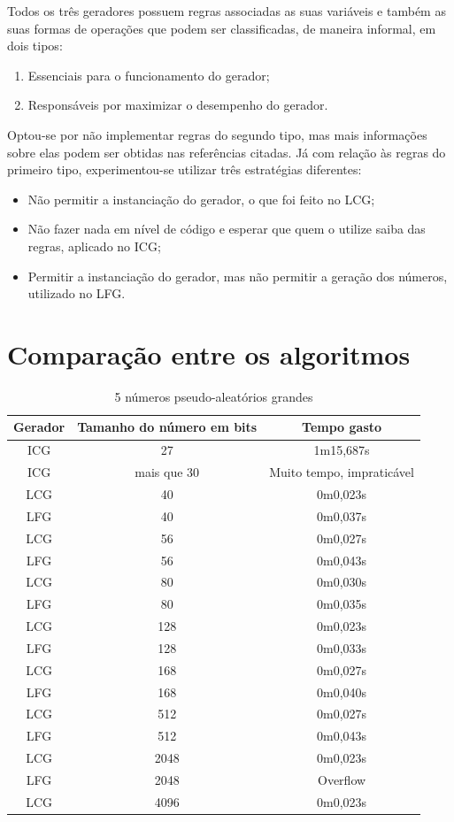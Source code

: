 \documentclass[12pt]{article}
\begin{document}
Todos os três geradores possuem regras associadas as suas variáveis e também as
suas formas de operações que podem ser classificadas, de maneira informal, em
dois tipos:
\begin{enumerate}
  \item Essenciais para o funcionamento do gerador;
  \item Responsáveis por maximizar o desempenho do gerador.
\end{enumerate}
Optou-se por não implementar regras do segundo tipo, mas mais informações sobre
elas podem ser obtidas nas referências citadas. Já com relação às regras do
primeiro tipo, experimentou-se utilizar três estratégias diferentes:
\begin{itemize}
  \item Não permitir a instanciação do gerador, o que foi feito no LCG;
  \item Não fazer nada em nível de código e esperar que quem o utilize saiba das
  regras, aplicado no ICG;
  \item Permitir a instanciação do gerador, mas não permitir a geração dos
  números, utilizado no LFG.
\end{itemize}

\section{Comparação entre os algoritmos}
\begin{table}[h]
  \centering
  \caption{5 números pseudo-aleatórios grandes}
  \begin{tabular}{|c|c|c|}
  \hline
  Gerador & Tamanho do número em bits & Tempo gasto  \\ \hline
  ICG     & 27 & 1m15,687s \\ \hline
  ICG     & mais que 30 & Muito tempo, impraticável \\ \hline
  LCG     & 40 & 0m0,023s  \\ \hline
  LFG     & 40 & 0m0,037s  \\ \hline
  LCG     & 56 & 0m0,027s  \\ \hline
  LFG     & 56 & 0m0,043s  \\ \hline
  LCG     & 80 & 0m0,030s  \\ \hline
  LFG     & 80 & 0m0,035s  \\ \hline
  LCG     & 128 & 0m0,023s  \\ \hline
  LFG     & 128 & 0m0,033s  \\ \hline
  LCG     & 168 & 0m0,027s  \\ \hline
  LFG     & 168 & 0m0,040s  \\ \hline
  LCG     & 512 & 0m0,027s  \\ \hline
  LFG     & 512 & 0m0,043s  \\ \hline
  LCG     & 2048 & 0m0,023s  \\ \hline
  LFG     & 2048 & Overflow \\ \hline
  LCG     & 4096 & 0m0,023s  \\ \hline
  \end{tabular}
\end{table}
\end{document}

